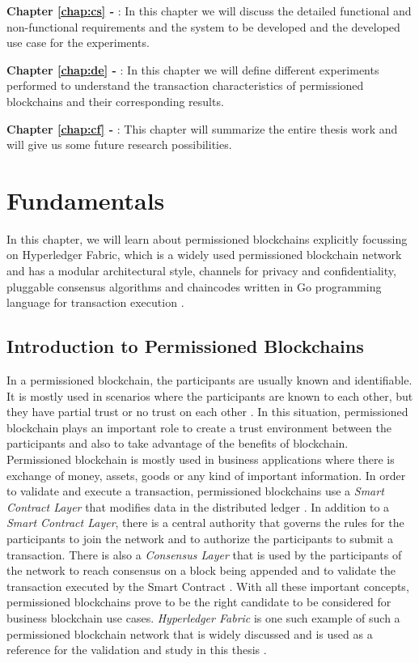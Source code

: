 \documentclass[
  a4paper,  %
  twoside,  %
  bibliography=totoc,
  headsepline,
  cleardoublepage=empty,
  parskip=half,
  draft=false
]{scrbook}
\begin{document}
\textbf{Chapter \ref{chap:cs} - } : In this chapter we will discuss the detailed functional and non-functional requirements and the system to be developed and the developed use case for the experiments.

\textbf{Chapter \ref{chap:de} - } : In this chapter we will define different experiments performed to understand the transaction characteristics of permissioned blockchains and their corresponding results.

\textbf{Chapter \ref{chap:cf} - } : This chapter will summarize the entire thesis work and will give us some future research possibilities.


\chapter{Fundamentals}
\label{chap:fund}
In this chapter, we will learn about permissioned blockchains explicitly focussing on Hyperledger Fabric, which is a widely used permissioned blockchain network and has a modular architectural style, channels for privacy and confidentiality, pluggable consensus algorithms and chaincodes written in Go programming language for transaction execution \cite{HF}.

\section{Introduction to Permissioned Blockchains }
In a permissioned blockchain, the participants are usually known and identifiable. It is mostly used in scenarios where the participants are known to each other, but they have partial trust or no trust on each other \cite{HF}. In this situation, permissioned blockchain plays an important role to create a trust environment between the participants and also to take advantage of the benefits of blockchain. Permissioned blockchain is mostly used in business applications where there is exchange of money, assets, goods or any kind of important information. In order to validate and execute a transaction, permissioned blockchains use a \textit{Smart Contract Layer} that modifies data in the distributed ledger \cite{HW2}. In addition to a \textit{Smart Contract Layer}, there is a central authority that governs the rules for the participants to join the network and to authorize the participants to submit a transaction. There is also a \textit{Consensus Layer} that is used by the participants of the network to reach consensus on a block being appended and to validate the transaction executed by the Smart Contract \cite{HW1}. With all these important concepts, permissioned blockchains prove to be the right candidate to be considered for business blockchain use cases. \textit{Hyperledger Fabric} is one such example of such a permissioned blockchain network that is widely discussed and is used as a reference for the validation and study in this thesis \cite{HO}.
\end{document}
